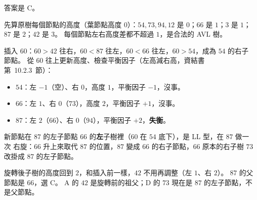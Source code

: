 \begin{pastsoln}
答案是 C。

先算原樹每個節點的高度（葉節點高度 $0$）：$54, 73, 94, 12$ 是 $0$；$66$ 是 $1$；$3$ 是 $1$；
$87$ 是 $2$；$42$ 是 $3$。 每個節點左右高度差都不超過 $1$，是合法的 AVL 樹。

插入 $60$：$60 > 42$ 往右，$60 < 87$ 往左，$60 < 66$ 往左，$60 > 54$，成為 $54$ 的右子節點。
從 $60$ 往上更新高度、檢查平衡因子（左高減右高，資結書第~10.2.3~節）：
\begin{itemize}
\item $54$：左 $-1$（空）、右 $0$，高度 $1$，平衡因子 $-1$，沒事。
\item $66$：左 $1$、右 $0$（$73$），高度 $2$，平衡因子 $+1$，沒事。
\item $87$：左 $2$（$66$）、右 $0$（$94$），平衡因子 $+2$，\textbf{失衡}。
\end{itemize}
新節點在 $87$ 的左子節點 $66$ 的\textbf{左}子樹裡（$60$ 在 $54$ 底下），是 LL 型，在 $87$ 做一次
右旋：$66$ 升上來取代 $87$ 的位置，$87$ 變成 $66$ 的右子節點，$66$ 原本的右子樹 $73$ 改掛成
$87$ 的左子節點。
\begin{center}
\end{center}
旋轉後子樹的高度回到 $2$，和插入前一樣，$42$ 不用再調整（左 $1$、右 $2$）。 $87$ 的父節點是
$66$，選 C。 A 的 $42$ 是旋轉前的祖父；D 的 $73$ 現在是 $87$ 的左子節點，不是父節點。
\end{pastsoln}
